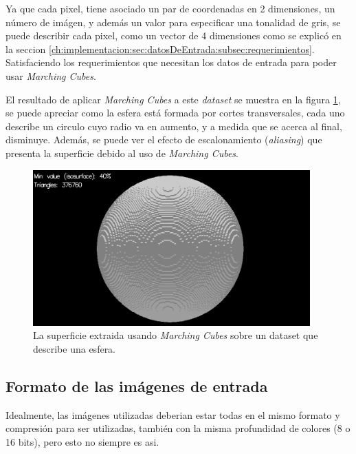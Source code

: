 Ya que cada pixel, tiene asociado un par de coordenadas en 2 dimensiones, un número de imágen, y además un valor para especificar una tonalidad de gris, se puede describir cada pixel, como un vector de 4 dimensiones como se explicó en la seccion \ref{ch:implementacion:sec:datosDeEntrada:subsec:requerimientos}. Satisfaciendo los requerimientos que necesitan los datos de entrada para poder usar \emph{Marching Cubes}.

El resultado de aplicar \emph{Marching Cubes} a este \emph{dataset} se muestra en la figura \ref{f:implementacion:ImSphRad100:screenshot_40}, se puede apreciar como la esfera está formada por cortes transversales, cada uno describe un circulo cuyo radio va en aumento, y a medida que se acerca al final, disminuye. Además, se puede ver el efecto de escalonamiento (\emph{aliasing}) que presenta la superficie debido al uso de \emph{Marching Cubes}.

\begin{figure}[hbt]
	\centering
	\includegraphics[width=0.95\textwidth]
	{images/results/ImSphRad100/screenshot_40.png}
	\caption{La superficie extraida usando \emph{Marching Cubes} sobre un dataset que describe una esfera.}
	\label{f:implementacion:ImSphRad100:screenshot_40}
\end{figure}

\subsection{Formato de las imágenes de entrada}
\label{ch:implementacion:sec:datosDeEntrada:subsec:formatodelasimagenesdeentrada}

Idealmente, las imágenes utilizadas deberian estar todas en el mismo formato y compresión para ser utilizadas, también con la misma profundidad de colores (8 o 16 bits), pero esto no siempre es asi.

